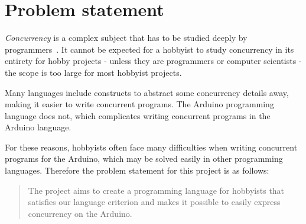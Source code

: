 \section{Problem statement}\label{sec:problemstatement}
\textit{Concurrency} is a complex subject that has to be studied deeply by programmers~\cite{Sebesta2016}. It cannot be expected for a hobbyist to study concurrency in its entirety for hobby projects - unless they are programmers or computer scientists - the scope is too large for most hobbyist projects.

Many languages include constructs to abstract some concurrency details away, making it easier to write concurrent programs. The Arduino programming language does not, which complicates writing concurrent programs in the Arduino language.

For these reasons, hobbyists often face many difficulties when writing concurrent programs for the Arduino, which may be solved easily in other programming languages. Therefore the problem statement for this project is as follows:

\blockquote{The project aims to create a programming language for hobbyists that satisfies our language criterion and makes it possible to easily express concurrency on the Arduino.}








